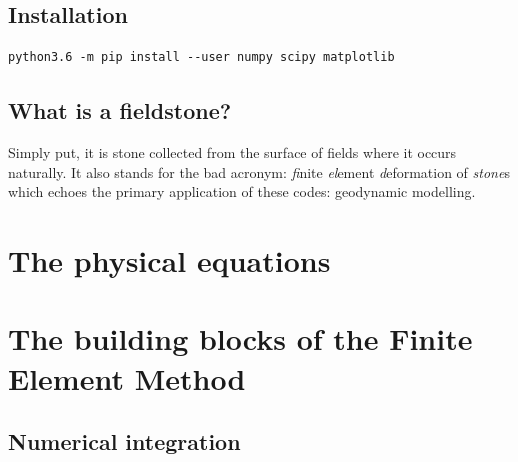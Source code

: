 \documentclass[a4paper]{article}
\begin{document}
\subsection{Installation}

\begin{verbatim}
python3.6 -m pip install --user numpy scipy matplotlib
\end{verbatim}

\subsection{What is a fieldstone?} %

Simply put, it is stone collected from the surface of fields where it occurs naturally.
It also stands for the bad acronym: {\sl fi}nite {\sl el}ement {\sl d}eformation
of {\sl stone}s which echoes the primary application of these codes: geodynamic modelling.





\newpage
\section{The physical equations} %



\newpage
\section{The building blocks of the Finite Element Method} %

\subsection{Numerical integration}  %
\end{document}
